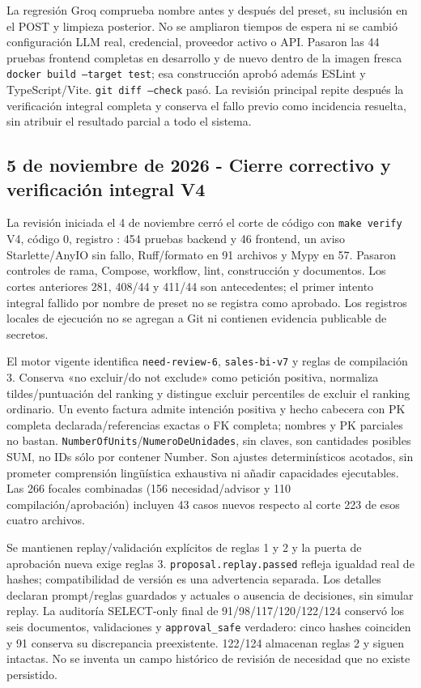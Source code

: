 \documentclass[11pt,letterpaper]{article}
\newcommand{\file}[1]{\texttt{#1}}
\begin{document}
La regresión Groq comprueba nombre antes y después del preset, su inclusión
en el POST y limpieza posterior. No se ampliaron tiempos de espera ni se
cambió configuración LLM real, credencial, proveedor activo o API. Pasaron las
44 pruebas frontend completas en desarrollo y de nuevo dentro de la imagen
fresca \file{docker build --target test}; esa construcción aprobó además
ESLint y TypeScript/Vite. \file{git diff --check} pasó. La revisión principal
repite después la verificación integral completa y conserva el fallo previo
como incidencia resuelta, sin atribuir el resultado parcial a todo el sistema.

\subsection{5 de noviembre de 2026 - Cierre correctivo y verificación integral V4}

La revisión iniciada el 4 de noviembre cerró el corte de código con
\file{make verify} V4, código 0, registro
: 454 pruebas backend y 46 frontend,
un aviso Starlette/AnyIO sin fallo, Ruff/formato en 91 archivos y Mypy en 57.
Pasaron controles de rama, Compose, workflow, lint, construcción y documentos.
Los cortes anteriores 281, 408/44 y 411/44 son antecedentes; el primer intento
integral fallido por nombre de preset no se registra como aprobado. Los registros
locales de ejecución no se agregan a Git ni contienen evidencia publicable de secretos.

El motor vigente identifica \file{need-review-6}, \file{sales-bi-v7} y reglas de
compilación 3. Conserva «no excluir/do not exclude» como petición positiva,
normaliza tildes/puntuación del ranking y distingue excluir percentiles de excluir
el ranking ordinario. Un evento factura admite intención positiva y hecho cabecera
con PK completa declarada/referencias exactas o FK completa; nombres y PK parciales
no bastan. \file{NumberOfUnits}/\file{NumeroDeUnidades}, sin claves, son cantidades
posibles SUM, no IDs sólo por contener Number. Son ajustes determinísticos acotados,
sin prometer comprensión lingüística exhaustiva ni añadir capacidades ejecutables.
Las 266 focales combinadas (156 necesidad/advisor y 110 compilación/aprobación)
incluyen 43 casos nuevos respecto al corte 223 de esos cuatro archivos.

Se mantienen replay/validación explícitos de reglas 1 y 2 y la puerta de aprobación
nueva exige reglas 3. \file{proposal.replay.passed} refleja igualdad real de hashes;
compatibilidad de versión es una advertencia separada. Los detalles declaran
prompt/reglas guardados y actuales o ausencia de decisiones, sin simular replay.
La auditoría SELECT-only final de 91/98/117/120/122/124 conservó los seis documentos,
validaciones y \file{approval\_safe} verdadero: cinco hashes coinciden y 91 conserva
su discrepancia preexistente. 122/124 almacenan reglas 2 y siguen intactas. No se
inventa un campo histórico de revisión de necesidad que no existe persistido.
\end{document}

